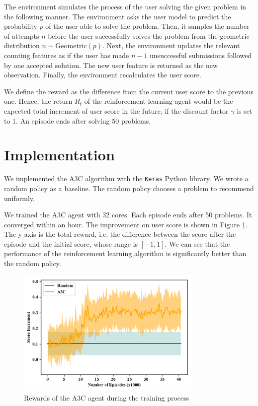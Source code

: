     The environment simulates the process of the user solving the given problem in the following manner.
    The environment asks the user model to predict the probability $p$ of the user able to solve the problem.
    Then, it samples the number of attempts $n$ before the user successfully solves the problem
    from the geometric distribution $n \sim \mathrm{Geometric}(p)$.
    Next, the environment updates the relevant counting features
    as if the user has made $n-1$ unsuccessful submissions followed by one accepted solution.
    The new user feature is returned as the new observation.
    Finally, the environment recalculates the user score.

    We define the reward as the difference from the current user score to the previous one.
    Hence, the return $R_t$ of the reinforcement learning agent
    would be the expected total increment of user score in the future,
    if the discount factor $\gamma$ is set to 1.
    An episode ends after solving 50 problems.

\section{Implementation}

    We implemented the A3C algorithm with the \verb|Keras|\cite{chollet2015keras} Python library.
    We wrote a random policy as a baseline.
    The random policy chooses a problem to recommend uniformly.

    We trained the A3C agent with 32 cores.
    Each episode ends after 50 problems.
    It converged within an hour.
    The improvement on user score is shown in Figure \ref{fig:a3c-episode-reward}.
    The y-axis is the total reward,
    i.e. the difference between the score after the episode and the initial score,
    whose range is $[-1,1]$.
    We can see that the performance of the reinforcement learning algorithm
    is significantly better than the random policy.

    \begin{figure}[htp]
        \centering
        \includegraphics[width=0.8\textwidth]{img/a3c-episode-reward.pdf}
        \caption{Rewards of the A3C agent during the training process}
        \label{fig:a3c-episode-reward}
    \end{figure}

